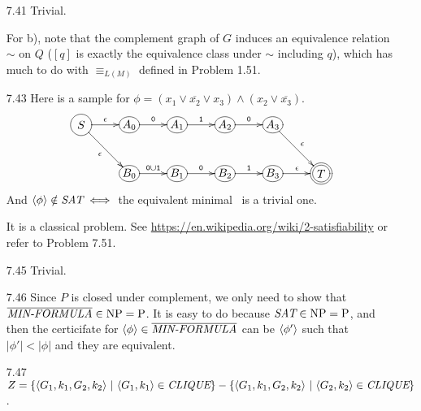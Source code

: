 \begin{itemize}
	\item[\Star 7.40] 
	\Omit
	
	\item[7.41]
	Trivial.
	
	\item[\Star 7.42]
	For b), note that the complement graph of $G$ induces an equivalence relation $\sim$ on $Q$ ($[q]$ is exactly the equivalence class under $\sim$ including $q$), which has much to do with $\equiv_{L(M)}$ defined in Problem 1.51.
	
	\item[7.43]
	Here is a sample for $\phi = (x_1 \vee \overline{x_2} \vee x_3) \wedge (x_2 \vee \overline{x_3})$.
	$$
	\xymatrix@R=2pc@C=2pc{
		*+<1pc>[o][F-]{S} \ar[r]^{\epsilon} \ar[rd]_{\epsilon} & 
		*+[o][F-]{A_0} \ar[r]^{\TT{0}} & 
		*+[o][F-]{A_1} \ar[r]^{\TT{1}} & 
		*+[o][F-]{A_2} \ar[r]^{\TT{0}} &
		*+[o][F-]{A_3} \ar[rd]^{\epsilon} \\ & 
		*+[o][F-]{B_0} \ar[r]^{\TT{0} \cup \TT{1}} & 
		*+[o][F-]{B_1} \ar[r]^{\TT{0}} & 
		*+[o][F-]{B_2} \ar[r]^{\TT{1}} &
		*+[o][F-]{B_3} \ar[r]^{\epsilon} &
		*+<1pc>[o][F=]{T}
	}
	$$
	And $\Bra{\phi} \notin \IT{SAT} \iff $ the equivalent minimal \NFA\ is a trivial one.
	
	\item[\Star 7.44]
	It is a classical problem. See \url{https://en.wikipedia.org/wiki/2-satisfiability} or refer to Problem 7.51.
	
	\item[7.45]
	Trivial.
	
	\item[7.46]
	Since $P$ is closed under complement, we only need to show that $\overline{\IT{MIN-FORMULA}} \in \NPoly = \Poly$. It is easy to do because $\IT{SAT} \in \NPoly = \Poly$, and then the certicifate for $\Bra{\phi} \in \overline{\IT{MIN-FORMULA}}$ can be $\Bra{\phi'}$ such that $|\phi'| < |\phi|$ and they are equivalent.
	
	\item[7.47]
	$Z = \{ \Bra{G_1, k_1, G_2, k_2} \ | \ \Bra{G_1, k_1} \in \IT{CLIQUE} \} - \{ \Bra{G_1, k_1, G_2, k_2} \ | \ \Bra{G_2, k_2} \in \IT{CLIQUE} \} $.
	

\end{itemize}
